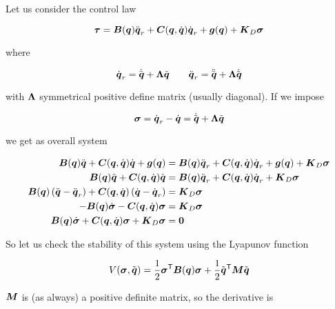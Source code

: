 Let us consider the control law

\[
	\vect\tau = \matr{B}(\q)\ddq_r + \matr{C}(\q,\dq)\dq_r + \vect{g}(\q) + \K_D\vect\sigma
\]

where

\[
	\dq_r = \dqd + \matr\Lambda \qe \qquad \ddq_r = \ddqd + \matr\Lambda \dqe
\]

with $\matr\Lambda$ symmetrical positive define matrix (usually diagonal).
If we impose

\[
	\vect\sigma = \dq_r - \dq = \dqe + \matr\Lambda\qe
\]

we get as overall system

\begin{align}
    \matr{B}(\q)\ddq + \matr{C}(\q,\dq)\dq + \vect{g}(\q) &= \matr{B}(\q)\ddq_r + \matr{C}(\q,\dq)\dq_r + \vect{g}(\q) + \K_D \vect\sigma \nonumber \\
    \matr{B}(\q)\ddq + \matr{C}(\q,\dq)\dq  &= \matr{B}(\q)\ddq_r + \matr{C}(\q,\dq)\dq_r + \K_D \vect\sigma \nonumber \\
    \matr{B}(\q) \left( \ddq - \ddq_r \right) + \matr{C}(\q,\dq) \left( \dq - \dq_r \right) &= \K_D \vect\sigma \nonumber \\
    - \matr{B}(\q) \dot{\vect\sigma} - \matr{C}(\q,\dq) \vect\sigma &= \K_D \vect\sigma \nonumber \\
    \matr{B}(\q) \dot{\vect\sigma} + \matr{C}(\q,\dq) \vect\sigma + \K_D \vect\sigma &= \0 \label{eq:adaptive-control-sigma-dynamics}
\end{align}

So let us check the stability of this system using the Lyapunov function

\[
	V(\vect\sigma, \qe) = \frac{1}{2} \vect\sigma^\trans \B(\q) \vect\sigma + \frac{1}{2} \qe^\trans \matr M \qe
\]

$\matr M$ is (as always) a positive definite matrix, so the derivative is

